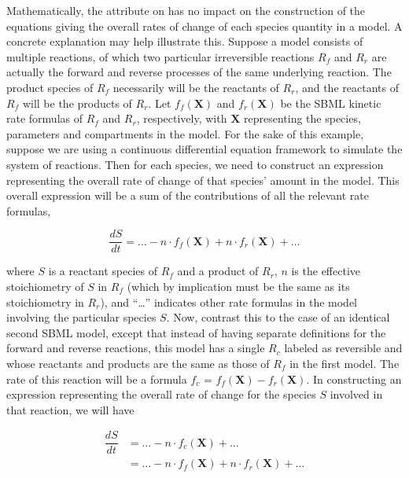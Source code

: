 Mathematically, the  attribute on \Reaction has no
impact on the construction of the equations giving the overall
rates of change of each species quantity in a model.  A concrete
explanation may help illustrate this.  Suppose a model consists of
multiple reactions, of which two particular irreversible reactions
$R_f$ and $R_r$ are actually the forward and reverse processes of
the same underlying reaction.  The product species of $R_f$
necessarily will be the reactants of $R_r$, and the reactants of
$R_f$ will be the products of $R_r$.  Let $f_f(\mathbf{X})$ and
$f_r(\mathbf{X})$ be the SBML kinetic rate formulas of $R_f$ and
$R_r$, respectively, with $\mathbf{X}$ representing the species,
parameters and compartments in the model.  For the sake of this
example, suppose we are using a continuous differential equation
framework to simulate the system of reactions.  Then for each
species, we need to construct an expression representing the
overall rate of change of that species' amount in the model.  This
overall expression will be a sum of the contributions of all the
relevant rate formulas,
\begin{linenomath}
  \begin{equation*}
    \frac{dS}{dt} =  \ldots - n \! \cdot \! f_f(\mathbf{X}) + n \! \cdot \! f_r(\mathbf{X}) + \ldots 
  \end{equation*}
\end{linenomath}
where $S$ is a reactant species of $R_f$ and a product of $R_r$,
$n$ is the effective stoichiometry of $S$ in $R_f$ (which by
implication must be the same as its stoichiometry in $R_r$), and
``\ldots'' indicates other rate formulas in the model involving
the particular species $S$.  Now, contrast this to the case of an
identical second SBML model, except that instead of having
separate \Reaction definitions for the forward and reverse
reactions, this model has a single \Reaction $R_c$ labeled as
reversible and whose reactants and products are the same as those
of $R_f$ in the first model.  The rate of this reaction will be a
formula $f_c$ = $f_f(\mathbf{X}) - f_r(\mathbf{X})$.  In
constructing an expression representing the overall rate of change
for the species $S$ involved in that reaction, we will have
\begin{linenomath}
  \begin{equation*}
    \begin{aligned}
      \dfrac{dS}{dt} & = \ldots - n \! \cdot \! f_c(\mathbf{X}) + \ldots \\
                     & = \ldots - n \! \cdot \! f_f(\mathbf{X}) + n \! \cdot \! f_r(\mathbf{X}) + \ldots 
    \end{aligned}
  \end{equation*}
\end{linenomath}

